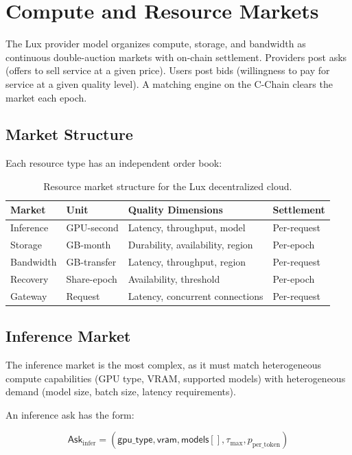 \documentclass[11pt,a4paper]{article}
\begin{document}
\section{Compute and Resource Markets}\label{sec:markets}

The Lux provider model organizes compute, storage, and bandwidth as
continuous double-auction markets with on-chain settlement. Providers
post asks (offers to sell service at a given price). Users post bids
(willingness to pay for service at a given quality level). A matching
engine on the C-Chain clears the market each epoch.

\subsection{Market Structure}

Each resource type has an independent order book:

\begin{table}[H]
\centering
\caption{Resource market structure for the Lux decentralized cloud.}
\label{tab:markets}
\begin{tabular}{llll}
\toprule
\textbf{Market} & \textbf{Unit} & \textbf{Quality Dimensions} & \textbf{Settlement} \\
\midrule
Inference & GPU-second & Latency, throughput, model & Per-request \\
Storage & GB-month & Durability, availability, region & Per-epoch \\
Bandwidth & GB-transfer & Latency, throughput, region & Per-request \\
Recovery & Share-epoch & Availability, threshold & Per-epoch \\
Gateway & Request & Latency, concurrent connections & Per-request \\
\bottomrule
\end{tabular}
\end{table}

\subsection{Inference Market}

The inference market is the most complex, as it must match heterogeneous
compute capabilities (GPU type, VRAM, supported models) with heterogeneous
demand (model size, batch size, latency requirements).

An inference ask has the form:

\begin{equation}
    \mathsf{Ask}_{\text{infer}} = (\mathsf{gpu\_type}, \mathsf{vram}, \mathsf{models}[], \tau_{\max}, p_{\text{per\_token}})
\end{equation}
\end{document}
